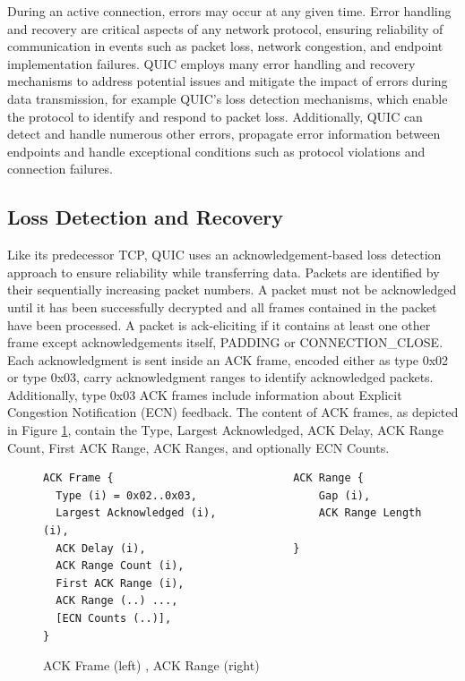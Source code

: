 During an active connection, errors may occur at any given time. Error handling and recovery are critical aspects of any network
protocol, ensuring
reliability of communication in events such as packet loss, network congestion, and endpoint implementation failures. QUIC employs
many error
handling and recovery mechanisms to address potential issues and mitigate the impact of errors during data transmission, for
example QUIC's loss detection mechanisms, which enable the protocol to identify and respond to packet loss. Additionally,
QUIC can detect and handle numerous other errors, propagate error information between endpoints and handle exceptional
conditions such as protocol violations and connection failures.

\subsection{Loss Detection and Recovery} \label{loss_detection_recovery}

Like its predecessor TCP, QUIC uses an acknowledgement-based loss detection approach to ensure reliability while transferring
data. Packets are identified by their sequentially increasing packet numbers. A packet must not be acknowledged until it has been
successfully decrypted and all frames contained in the packet have been processed. A packet is ack-eliciting
if it contains at least one other frame except acknowledgements itself, PADDING or CONNECTION\_CLOSE. Each acknowledgment is
sent inside an ACK frame, encoded either as type 0x02 or type 0x03, carry acknowledgment ranges to identify acknowledged packets.
Additionally, type 0x03 ACK frames include information about Explicit Congestion Notification (ECN) feedback. The content of ACK
frames, as depicted in Figure \ref{ack_frame}, contain the Type, Largest Acknowledged, ACK Delay, ACK Range Count, First ACK
Range, ACK Ranges, and optionally ECN Counts. 

\begin{figure}[htb]
    \centering      
\begin{verbatim}
ACK Frame {                            ACK Range {
  Type (i) = 0x02..0x03,                   Gap (i),
  Largest Acknowledged (i),                ACK Range Length (i),
  ACK Delay (i),                       }
  ACK Range Count (i),        
  First ACK Range (i),        
  ACK Range (..) ...,         
  [ECN Counts (..)],          
}
\end{verbatim}
    \caption{ACK Frame (left) \cite[106]{rfc9000}, ACK Range (right) \cite[107]{rfc9000}}
    \label{ack_frame}
\end{figure}

